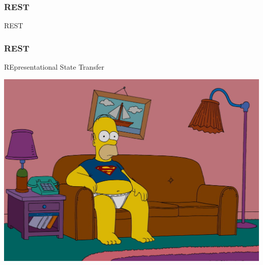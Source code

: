 \begin{frame}
  \frametitle{REST}
  \begin{center}
    REST
  \end{center}
\end{frame}

\begin{frame}
  \frametitle{REST}
  \begin{center}
    \alert{RE}presentational \alert{S}tate \alert{T}ransfer
  \end{center}
\end{frame}

\begin{frame}[plain]
  \begin{changemargin}{-1cm}{-1cm}
    \begin{center}
      \includegraphics[width=\paperwidth, height=\paperheight, keepaspectratio]{images/homer-on-couch.jpg}
    \end{center}
  \end{changemargin}
\end{frame}

